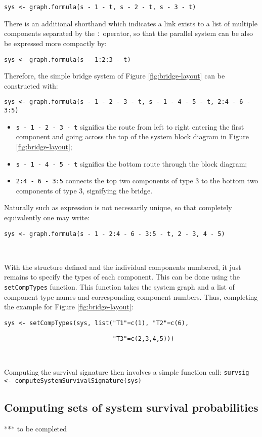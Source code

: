 \documentclass[12pt, a4paper]{elsarticle}
\begin{document}
\noindent\texttt{sys <- graph.formula(s\,-\,1\,-\,t, s\,-\,2\,-\,t, s\,-\,3\,-\,t)}

There is an additional shorthand which indicates a link exists to a list of multiple components separated by the \texttt{:} operator, so that the parallel system can be also be expressed more compactly by:

\noindent\texttt{sys <- graph.formula(s\,-\,1:2:3\,-\,t)}

Therefore, the simple bridge system of Figure \ref{fig:bridge-layout} can be constructed with:

\noindent\texttt{sys <- graph.formula(s\,-\,1\,-\,2\,-\,3\,-\,t, s\,-\,1\,-\,4\,-\,5\,-\,t, 2:4\,-\,6\,-\,3:5)}
\begin{itemize}
  \item \texttt{s\,-\,1\,-\,2\,-\,3\,-\,t} signifies the route from left to right entering the first component and going across the top of the system block diagram in Figure \ref{fig:bridge-layout};
  \item \texttt{s\,-\,1\,-\,4\,-\,5\,-\,t} signifies the bottom route through the block diagram;
  \item \texttt{2:4\,-\,6\,-\,3:5} connects the top two components of type 3 to the bottom two components of type 3, signifying the bridge.
\end{itemize}
Naturally such as expression is not necessarily unique, so that completely equivalently one may write:

\noindent\texttt{sys <- graph.formula(s\,-\,1\,-\,2:4\,-\,6\,-\,3:5\,-\,t, 2\,-\,3, 4\,-\,5)}

\ 

With the structure defined and the individual components numbered, it 
just remains to specify the types of each component.  This can be done
using the \texttt{setCompTypes} function.  This function takes the
system graph and a list of component type names and corresponding
component numbers.  Thus, completing the example for Figure
\ref{fig:bridge-layout}:

\noindent\texttt{sys <- setCompTypes(sys, list("T1"=c(1), "T2"=c(6),}

\noindent\texttt{~~~~~~~~~~~~~~~~~~~~~~~~~~~~~~"T3"=c(2,3,4,5)))}

\ 

Computing the survival signature then involves a simple function call:
\noindent\texttt{survsig <- computeSystemSurvivalSignature(sys)}

\subsection{Computing sets of system survival probabilities}

*** to be completed
\end{document}
